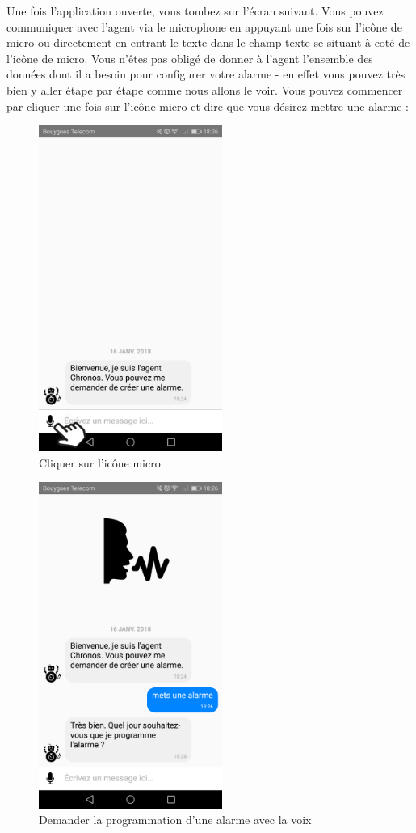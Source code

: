 Une fois l'application ouverte, vous tombez sur l'écran suivant. Vous pouvez communiquer avec l'agent via le microphone en appuyant une fois sur l'icône de micro
ou directement en entrant le texte dans le champ texte se situant à coté de l'icône de micro. Vous n'êtes pas obligé de donner à l'agent l'ensemble des données
dont il a besoin pour configurer votre alarme - en effet vous pouvez très bien y aller étape par étape comme nous allons le voir. Vous pouvez commencer par cliquer
une fois sur l'icône micro et dire que vous désirez mettre une alarme :

\begin{figure}[H]
  \centering
  \includegraphics[width=6cm]{images/B.png}
  \caption{Cliquer sur l'icône micro}
\end{figure}

\begin{figure}[H]
  \centering
  \includegraphics[width=6cm]{images/C.png}
  \caption{Demander la programmation d'une alarme avec la voix}
\end{figure}

